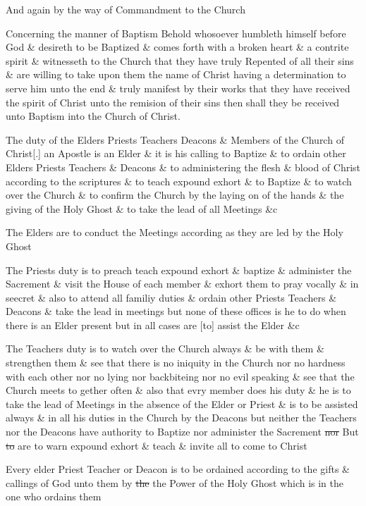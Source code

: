 		And again by the way of Commandment to the Church

		Concerning the manner of Baptism Behold whosoever humbleth himself before God \& desireth to be Baptized \& comes forth with a broken heart \& a contrite spirit \& witnesseth to the Church that they have truly Repented of all their sins \& are willing to take upon them the name of Christ having a determination to serve him unto the end \& truly manifest by their works that they have received the spirit of Christ unto the remision of their sins then shall they be received unto Baptism into the Church of Christ.

		The duty of the Elders Priests Teachers Deacons \& Members of the Church of Christ[.] an Apostle is an Elder \& it is his calling to Baptize \& to ordain other Elders Priests Teachers \& Deacons \& to administering the flesh \& blood of Christ according to the scriptures \& to teach expound exhort \& to Baptize \& to watch over the Church \& to confirm the Church by the laying on of the hands \& the giving of the Holy Ghost \& to take the lead of all Meetings \&c

		The Elders are to conduct the Meetings according as they are led by the Holy Ghost

		The Priests duty is to preach teach expound exhort \& baptize \& administer the Sacrement \& visit the House of each member \& exhort them to pray vocally \& in seecret \& also to attend all familiy duties \& ordain other Priests Teachers \& Deacons \& take the lead in meetings but none of these offices is he to do when there is an Elder present but in all cases are [to] assist the Elder \&c

		The Teachers duty is to watch over the Church always \& be with them \& strengthen them \& see that there is no iniquity in the Church nor no hardness with each other nor no lying nor backbiteing nor no evil speaking \& see that the Church meets to gether often \& also that evry member does his duty \& he is to take the lead of Meetings in the absence of the Elder or Priest \& is to be assisted always \& in all his duties in the Church by the Deacons but neither the Teachers nor the Deacons have authority to Baptize nor administer the Sacrement \sout{nor} But \sout{to} are to warn expound exhort \& teach \& invite all to come to Christ

		Every elder Priest Teacher or Deacon is to be ordained according to the gifts \& callings of God unto them by \sout{the} the Power of the Holy Ghost which is in the one who ordains them

